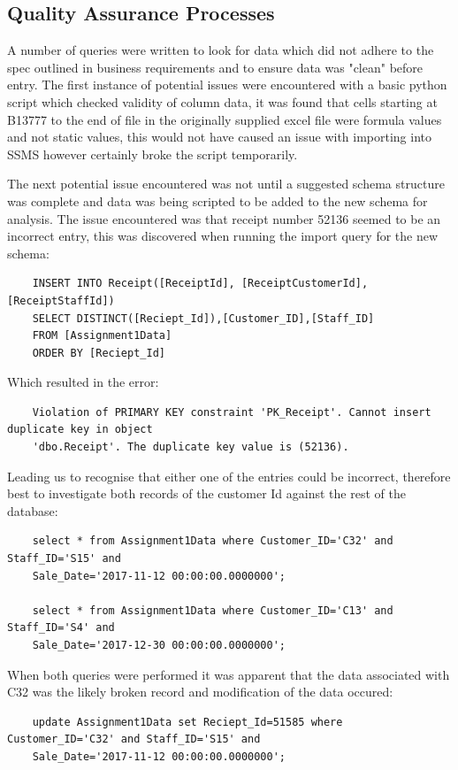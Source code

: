 \documentclass{article}
\newcounter{num}
\begin{document}
        \subsection{Quality Assurance Processes}
            A number of queries were written to look for data which did not adhere to the spec
            outlined in business requirements and to ensure data was "clean" before entry.
            The first instance of potential issues were encountered with a basic python script
            which checked validity of column data, it was found that cells starting at B13777
            to the end of file in the originally supplied excel file were formula values and 
            not static values, this would not have caused an issue with importing into SSMS 
            however certainly broke the script temporarily.
            \vspace{5mm}
            \par\noindent
            The next potential issue encountered was not until a suggested schema structure 
            was complete and data was being scripted to be added to the new schema for analysis.
            The issue encountered was that receipt number 52136 seemed to be an incorrect 
            entry, this was discovered when running the import query for the new schema:
            \begin{verbatim}
    INSERT INTO Receipt([ReceiptId], [ReceiptCustomerId],[ReceiptStaffId])
    SELECT DISTINCT([Reciept_Id]),[Customer_ID],[Staff_ID]
    FROM [Assignment1Data]
    ORDER BY [Reciept_Id]
            \end{verbatim}
            Which resulted in the error:
            \color{red}
            \begin{verbatim}
    Violation of PRIMARY KEY constraint 'PK_Receipt'. Cannot insert duplicate key in object 
    'dbo.Receipt'. The duplicate key value is (52136).
            \end{verbatim}
            \color{black}
            Leading us to recognise that either one of the entries could be incorrect, therefore
            best to investigate both records of the customer Id against the rest of the database:
            \begin{verbatim}
    select * from Assignment1Data where Customer_ID='C32' and Staff_ID='S15' and 
    Sale_Date='2017-11-12 00:00:00.0000000';

    select * from Assignment1Data where Customer_ID='C13' and Staff_ID='S4' and 
    Sale_Date='2017-12-30 00:00:00.0000000';
            \end{verbatim}
            When both queries were performed it was apparent that the data associated with C32 was 
            the likely broken record and modification of the data occured:
            \begin{verbatim}
    update Assignment1Data set Reciept_Id=51585 where Customer_ID='C32' and Staff_ID='S15' and 
    Sale_Date='2017-11-12 00:00:00.0000000';
            \end{verbatim}
\end{document}
